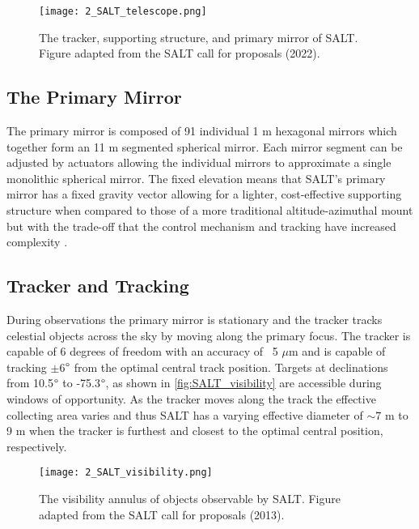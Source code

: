 \begin{figure}[t]
    \centering
    \texttt{[image: 2\_SALT\_telescope.png]}
    \caption{The tracker, supporting structure, and primary mirror of SALT. Figure adapted from the SALT call for proposals (2022).\protect\footnotemark}
    \label{fig:SALT_telescope}
\end{figure}

\subsection{The Primary Mirror}

The primary mirror is composed of 91 individual 1 m hexagonal mirrors which together form an 11 m segmented spherical mirror. Each mirror segment can be adjusted by actuators allowing the individual mirrors to approximate a single monolithic spherical mirror. The fixed elevation means that SALT's primary mirror has a fixed gravity vector allowing for a lighter, cost-effective supporting structure when compared to those of a more traditional altitude-azimuthal mount but with the trade-off that the control mechanism and tracking have increased complexity \citep{SALT_design}.

\subsection{Tracker and Tracking}

During observations the primary mirror is stationary and the tracker tracks celestial objects across the sky by moving along the primary focus. The tracker is capable of 6 degrees of freedom with an accuracy of ~5 $\mu$m and is capable of tracking $\pm$6$\degree$ from the optimal central track position. Targets at declinations from 10.5$\degree$ to -75.3$\degree$, as shown in \autoref{fig:SALT_visibility} are accessible during windows of opportunity. As the tracker moves along the track the effective collecting area varies and thus SALT has a varying effective diameter of $\sim7$ m to 9 m when the tracker is furthest and closest to the optimal central position, respectively.

\begin{figure}[t]
    \centering
    \texttt{[image: 2\_SALT\_visibility.png]}
    \caption{The visibility annulus of objects observable by SALT. Figure adapted from the SALT call for proposals (2013).\protect\footnotemark}
    \label{fig:SALT_visibility}
\end{figure}

